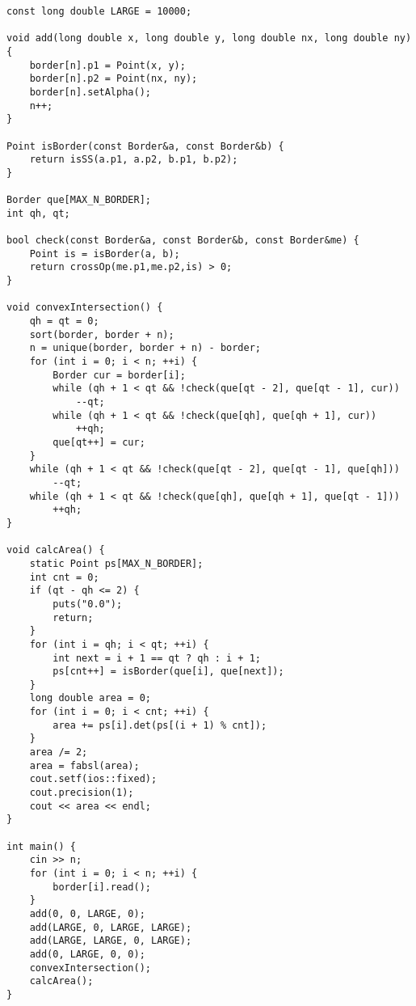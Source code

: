 \begin{verbatim}
const long double LARGE = 10000;

void add(long double x, long double y, long double nx, long double ny) {
    border[n].p1 = Point(x, y);
    border[n].p2 = Point(nx, ny);
    border[n].setAlpha();
    n++;
}

Point isBorder(const Border&a, const Border&b) {
    return isSS(a.p1, a.p2, b.p1, b.p2);
}

Border que[MAX_N_BORDER];
int qh, qt;

bool check(const Border&a, const Border&b, const Border&me) {
    Point is = isBorder(a, b);
    return crossOp(me.p1,me.p2,is) > 0;
}

void convexIntersection() {
    qh = qt = 0;
    sort(border, border + n);
    n = unique(border, border + n) - border;
    for (int i = 0; i < n; ++i) {
        Border cur = border[i];
        while (qh + 1 < qt && !check(que[qt - 2], que[qt - 1], cur))
            --qt;
        while (qh + 1 < qt && !check(que[qh], que[qh + 1], cur))
            ++qh;
        que[qt++] = cur;
    }
    while (qh + 1 < qt && !check(que[qt - 2], que[qt - 1], que[qh]))
        --qt;
    while (qh + 1 < qt && !check(que[qh], que[qh + 1], que[qt - 1]))
        ++qh;
}

void calcArea() {
    static Point ps[MAX_N_BORDER];
    int cnt = 0;
    if (qt - qh <= 2) {
        puts("0.0");
        return;
    }
    for (int i = qh; i < qt; ++i) {
        int next = i + 1 == qt ? qh : i + 1;
        ps[cnt++] = isBorder(que[i], que[next]);
    }
    long double area = 0;
    for (int i = 0; i < cnt; ++i) {
        area += ps[i].det(ps[(i + 1) % cnt]);
    }
    area /= 2;
    area = fabsl(area);
    cout.setf(ios::fixed);
    cout.precision(1);
    cout << area << endl;
}

int main() {
    cin >> n;
    for (int i = 0; i < n; ++i) {
        border[i].read();
    }
    add(0, 0, LARGE, 0);
    add(LARGE, 0, LARGE, LARGE);
    add(LARGE, LARGE, 0, LARGE);
    add(0, LARGE, 0, 0);
    convexIntersection();
    calcArea();
}
\end{verbatim}
